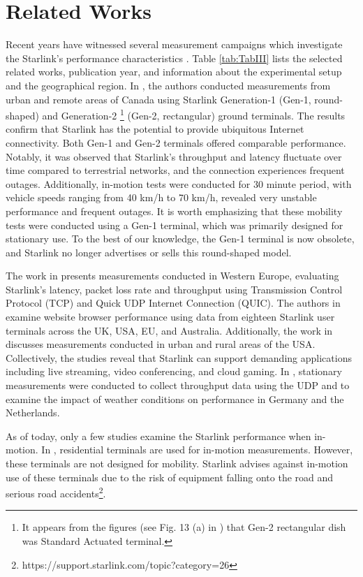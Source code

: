 \section{Related Works}
Recent years have witnessed several measurement campaigns which investigate the Starlink's performance characteristics \cite{Dominic_2024,Sami,Beckman,Melisa,Bin,Zhao,Michel,Kassem}. Table \ref{tab:TabIII} lists the selected related works, publication year, and information about the experimental setup and the geographical region. In \cite{Sami}, the authors conducted measurements from urban and remote areas of Canada using Starlink Generation-1 (Gen-1, round-shaped) and Generation-2 \footnote{It appears from the figures (see Fig. 13 (a) in \cite{Sami}) that Gen-2 rectangular dish was Standard Actuated terminal.} (Gen-2, rectangular) ground terminals. The results confirm that Starlink has the potential to provide ubiquitous Internet connectivity. Both Gen-1 and Gen-2 terminals offered comparable performance. Notably, it was observed that Starlink's throughput and latency fluctuate over time compared to terrestrial networks, and the connection experiences frequent outages. Additionally, in-motion tests were conducted for 30 minute period, with vehicle speeds ranging from 40 km/h to 70 km/h, revealed very unstable performance and frequent outages. It is worth emphasizing that these mobility tests were conducted using a Gen-1 terminal, which was primarily designed for stationary use. To the best of our knowledge, the Gen-1 terminal is now obsolete, and Starlink no longer advertises or sells this round-shaped model. 

The work in \cite{Michel} presents measurements conducted in Western Europe, evaluating Starlink's  latency, packet loss rate and throughput using Transmission Control Protocol 
 (TCP) and Quick UDP Internet Connection (QUIC). The authors in~\cite{Kassem} examine website browser performance using data from eighteen Starlink user terminals across the UK, USA, EU, and Australia. Additionally, the work in \cite{Zhao} discusses measurements conducted in urban and rural areas of the USA. Collectively, the studies \cite{Michel, Kassem, Zhao,Sami} reveal that Starlink can support demanding applications including live streaming, video conferencing, and cloud gaming. In \cite{WetLinks}, stationary measurements were conducted to collect throughput data using the UDP and to examine the impact of weather conditions on performance in Germany and the Netherlands.

As of today, only a few studies examine the Starlink performance when in-motion. In \cite{Bin,Sami,Melisa}, residential terminals are used for in-motion measurements. However, these terminals are not designed for mobility. Starlink advises against in-motion use of these terminals due to the risk of equipment falling onto the road and serious road accidents\footnote{https://support.starlink.com/topic?category=26}.


